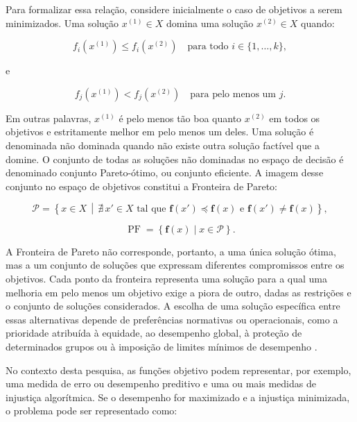 Para formalizar essa relação, considere inicialmente o caso de
objetivos a serem minimizados. Uma solução $x^{(1)} \in X$ domina uma
solução $x^{(2)} \in X$ quando:

\begin{equation}
    f_i\left(x^{(1)}\right)
    \leq
    f_i\left(x^{(2)}\right)
    \quad
    \text{para todo } i \in \{1,\ldots,k\},
\end{equation}

e

\begin{equation}
    f_j\left(x^{(1)}\right)
    <
    f_j\left(x^{(2)}\right)
    \quad
    \text{para pelo menos um } j.
\end{equation}

Em outras palavras, $x^{(1)}$ é pelo menos tão boa quanto
$x^{(2)}$ em todos os objetivos e estritamente melhor em pelo menos
um deles. Uma solução é denominada não dominada quando não existe
outra solução factível que a domine. O conjunto de todas as soluções
não dominadas no espaço de decisão é denominado conjunto
Pareto-ótimo, ou conjunto eficiente. A imagem desse conjunto no
espaço de objetivos constitui a Fronteira de Pareto:

\begin{equation}
    \mathcal{P}
    =
    \left\{
        x \in X \,\middle|\,
        \nexists\, x' \in X
        \text{ tal que }
        \mathbf{f}(x') \preceq \mathbf{f}(x)
        \text{ e }
        \mathbf{f}(x') \neq \mathbf{f}(x)
    \right\},
\end{equation}

\begin{equation}
    \operatorname{PF}
    =
    \left\{
        \mathbf{f}(x) \mid x \in \mathcal{P}
    \right\}.
\end{equation}

A Fronteira de Pareto não corresponde, portanto, a uma única solução
ótima, mas a um conjunto de soluções que expressam diferentes
compromissos entre os objetivos. Cada ponto da fronteira representa
uma solução para a qual uma melhoria em pelo menos um objetivo exige
a piora de outro, dadas as restrições e o conjunto de soluções
considerados. A escolha de uma solução específica entre essas
alternativas depende de preferências normativas ou operacionais, como
a prioridade atribuída à equidade, ao desempenho global, à proteção
de determinados grupos ou à imposição de limites mínimos de
desempenho \cite{miettinen1999nonlinear,deb2015multi}.

No contexto desta pesquisa, as funções objetivo podem representar,
por exemplo, uma medida de erro ou desempenho preditivo e uma ou mais
medidas de injustiça algorítmica. Se o desempenho for maximizado e a
injustiça minimizada, o problema pode ser representado como:

